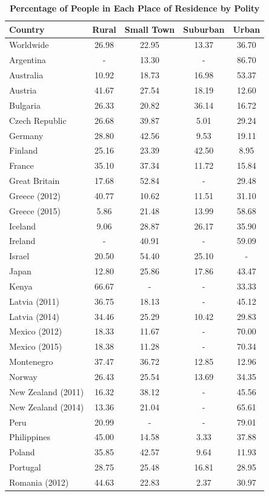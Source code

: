 \documentclass[12pt, titlepage]{article}
\newcommand\tb{\textbf}
\begin{document}
\begin{table}
	\centering
	\caption{\tb{Percentage of People in Each Place of Residence by Polity}}
	\begin{tabulary}{\linewidth}{l c c c c}
		\hline
		\tb{Country}&\tb{Rural}&\tb{Small Town}&\tb{Suburban}&\tb{Urban}\\
		\hline
		Worldwide&26.98&22.95&13.37&36.70 \\
		Argentina&-&13.30&-&86.70 \\
		Australia&10.92&18.73&16.98&53.37 \\
		Austria&41.67&27.54&18.19&12.60 \\
		Bulgaria&26.33&20.82&36.14&16.72 \\
		Czech Republic&26.68&39.87&5.01&29.24 \\
		Germany&28.80&42.56&9.53&19.11 \\
		Finland&25.16&23.39&42.50&8.95 \\
		France&35.10&37.34&11.72&15.84 \\
		Great Britain&17.68&52.84&-&29.48 \\
		Greece (2012)&40.77&10.62&11.51&31.10 \\
		Greece (2015)&5.86&21.48&13.99&58.68 \\
		Iceland&9.06&28.87&26.17&35.90 \\
		Ireland&-&40.91&-&59.09 \\
		Israel&20.50&54.40&25.10&- \\
		Japan&12.80&25.86&17.86&43.47 \\
		Kenya&66.67&-&-&33.33 \\
		Latvia (2011)&36.75&18.13&-&45.12 \\
		Latvia (2014)&34.46&25.29&10.42&29.83 \\
		Mexico (2012)&18.33&11.67&-&70.00 \\
		Mexico (2015)&18.38&11.28&-&70.34 \\
		Montenegro&37.47&36.72&12.85&12.96 \\
		Norway&26.43&25.54&13.69&34.35 \\
		New Zealand (2011)&16.32&38.12&-&45.56 \\
		New Zealand (2014)&13.36&21.04&-&65.61 \\
		Peru&20.99&-&-&79.01 \\
		Philippines&45.00&14.58&3.33&37.88 \\
		Poland&35.85&42.57&9.64&11.93 \\
		Portugal&28.75&25.48&16.81&28.95 \\
		Romania (2012)&44.63&22.83&2.37&30.97 \\

\end{tabulary}
\end{table}
\end{document}

